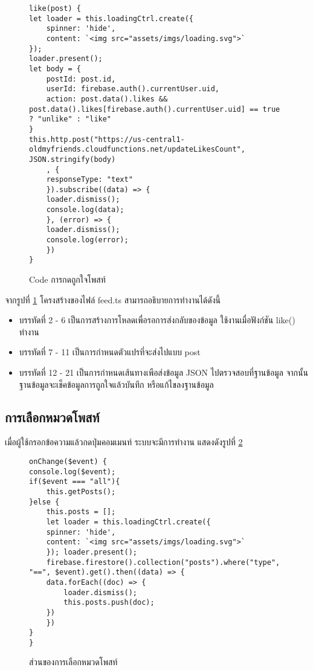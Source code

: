 \begin{figure}[H]
{\lstset{language=Pascal}
\begin{lstlisting}
like(post) {
let loader = this.loadingCtrl.create({
	spinner: 'hide',
	content: `<img src="assets/imgs/loading.svg">`
});
loader.present();
let body = {
	postId: post.id,
	userId: firebase.auth().currentUser.uid,
	action: post.data().likes && post.data().likes[firebase.auth().currentUser.uid] == true ? "unlike" : "like"
}
this.http.post("https://us-central1-oldmyfriends.cloudfunctions.net/updateLikesCount", JSON.stringify(body)
	, {
	responseType: "text"
	}).subscribe((data) => {
	loader.dismiss();
	console.log(data);
	}, (error) => {
	loader.dismiss();
	console.log(error);
	})
}
\end{lstlisting}}
\caption{Code การกดถูกใจโพสท์}
\label{Fig:4-likepost}
\end{figure}

จากรูปที่ \ref{Fig:4-likepost} โครงสร้างของไฟล์ feed.ts สามารถอธิบายการทำงานได้ดังนี้
\begin{itemize}[label={--}]
\item บรรทัดที่ 2 - 6 เป็นการสร้างการโหลดเพื่อรอการส่งกลับของข้อมูล ใช้งานเมื่อฟังก์ชัน like() ทำงาน
\item บรรทัดที่ 7 - 11 เป็นการกำหนดตัวแปรที่จะส่งไปแบบ post
\item บรรทัดที่ 12 - 21 เป็นการกำหนดเส้นทางเพือส่งข้อมูล JSON ไปตรวจสอบที่ฐานข้อมูล จากนั้นฐานข้อมูลจะเช็คข้อมูลการถูกใจแล้วบันทึก หรือแก้ไขลงฐานข้อมูล
\end{itemize}
\newpage



\subsection{การเลือกหมวดโพสท์}
เมื่อผู้ใช้กรอกข้อความแล้วกดปุ่มคอมเมนท์ ระบบจะมีการทำงาน แสดงดังรูปที่ \ref{Fig:4-selectpost}

\begin{figure}[H]
{\lstset{language=Pascal}
\begin{lstlisting}
onChange($event) {
console.log($event);
if($event === "all"){
	this.getPosts();
}else {
	this.posts = [];
	let loader = this.loadingCtrl.create({
	spinner: 'hide',
	content: `<img src="assets/imgs/loading.svg">`
	}); loader.present();
	firebase.firestore().collection("posts").where("type", "==", $event).get().then((data) => {
	data.forEach((doc) => {
		loader.dismiss();
		this.posts.push(doc);
	})
	})
}
}
\end{lstlisting}}
\caption{ส่วนของการเลือกหมวดโพสท์}
\label{Fig:4-selectpost}
\end{figure}

